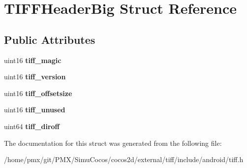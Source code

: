 \hypertarget{structTIFFHeaderBig}{}\section{T\+I\+F\+F\+Header\+Big Struct Reference}
\label{structTIFFHeaderBig}
\subsection*{Public Attributes}
\begin{DoxyCompactItemize}
\item 
\mbox{\label{structTIFFHeaderBig_a1da3f5b902d5f3f7b1b0ebafc727cf1f}} 
uint16 {\bfseries tiff\+\_\+magic}
\item 
\mbox{\label{structTIFFHeaderBig_a800c5885ddab65e80f0be15b394fca0e}} 
uint16 {\bfseries tiff\+\_\+version}
\item 
\mbox{\label{structTIFFHeaderBig_a5f2297912d099aa2005fa680c1555edb}} 
uint16 {\bfseries tiff\+\_\+offsetsize}
\item 
\mbox{\label{structTIFFHeaderBig_aaf85d0caba2a0f17bac3df1e86009350}} 
uint16 {\bfseries tiff\+\_\+unused}
\item 
\mbox{\label{structTIFFHeaderBig_a5b1890c3965fb428f2277b4acc0b8663}} 
uint64 {\bfseries tiff\+\_\+diroff}
\end{DoxyCompactItemize}


The documentation for this struct was generated from the following file\+:\begin{DoxyCompactItemize}
\item 
/home/pmx/git/\+P\+M\+X/\+Simu\+Cocos/cocos2d/external/tiff/include/android/tiff.\+h\end{DoxyCompactItemize}
